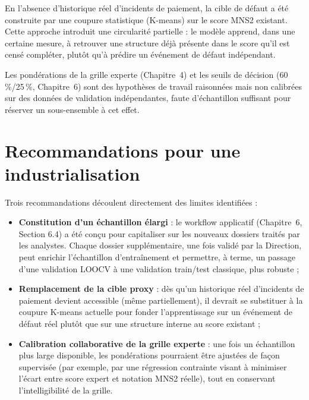 \begin{limite}
En l'absence d'historique réel d'incidents de paiement, la cible de défaut a été construite par
une coupure statistique (K-means) sur le score MNS2 existant. Cette approche introduit une
circularité partielle : le modèle apprend, dans une certaine mesure, à retrouver une structure
déjà présente dans le score qu'il est censé compléter, plutôt qu'à prédire un événement de
défaut indépendant.
\end{limite}

\begin{limite}
Les pondérations de la grille experte (Chapitre~4) et les seuils de décision (60\,\%/25\,\%,
Chapitre~6) sont des hypothèses de travail raisonnées mais non calibrées sur des données de
validation indépendantes, faute d'échantillon suffisant pour réserver un sous-ensemble à cet
effet.
\end{limite}

\section{Recommandations pour une industrialisation}

Trois recommandations découlent directement des limites identifiées :

\begin{itemize}
    \item \textbf{Constitution d'un échantillon élargi} : le workflow applicatif (Chapitre~6,
    Section 6.4) a été conçu pour capitaliser sur les nouveaux dossiers traités par les analystes.
    Chaque dossier supplémentaire, une fois validé par la Direction, peut enrichir l'échantillon
    d'entraînement et permettre, à terme, un passage d'une validation LOOCV à une validation
    train/test classique, plus robuste ;
    \item \textbf{Remplacement de la cible proxy} : dès qu'un historique réel d'incidents de
    paiement devient accessible (même partiellement), il devrait se substituer à la coupure
    K-means actuelle pour fonder l'apprentissage sur un événement de défaut réel plutôt que sur
    une structure interne au score existant ;
    \item \textbf{Calibration collaborative de la grille experte} : une fois un échantillon plus
    large disponible, les pondérations pourraient être ajustées de façon supervisée (par exemple,
    par une régression contrainte visant à minimiser l'écart entre score expert et notation MNS2
    réelle), tout en conservant l'intelligibilité de la grille.
\end{itemize}

